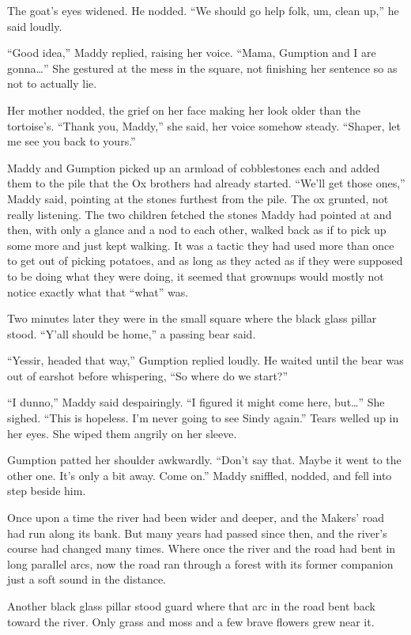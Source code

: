 \documentclass[10pt]{article}
\begin{document}
The goat's eyes widened. He nodded. ``We should go help folk, um, clean
up,'' he said loudly.

``Good idea,'' Maddy replied, raising her voice. ``Mama, Gumption and I
are gonna\ldots{}'' She gestured at the mess in the square, not
finishing her sentence so as not to actually lie.

Her mother nodded, the grief on her face making her look older than the
tortoise's. ``Thank you, Maddy,'' she said, her voice somehow steady.
``Shaper, let me see you back to yours.''

Maddy and Gumption picked up an armload of cobblestones each and added
them to the pile that the Ox brothers had already started. ``We'll get
those ones,'' Maddy said, pointing at the stones furthest from the pile.
The ox grunted, not really listening. The two children fetched the
stones Maddy had pointed at and then, with only a glance and a nod to
each other, walked back as if to pick up some more and just kept
walking. It was a tactic they had used more than once to get out of
picking potatoes, and as long as they acted as if they were supposed to
be doing what they were doing, it seemed that grownups would mostly not
notice exactly what that ``what'' was.

Two minutes later they were in the small square where the black glass
pillar stood. ``Y'all should be home,'' a passing bear said.

``Yessir, headed that way,'' Gumption replied loudly. He waited until
the bear was out of earshot before whispering, ``So where do we start?''

``I dunno,'' Maddy said despairingly. ``I figured it might come here,
but\ldots{}'' She sighed. ``This is hopeless. I'm never going to see
Sindy again.'' Tears welled up in her eyes. She wiped them angrily on
her sleeve.

Gumption patted her shoulder awkwardly. ``Don't say that. Maybe it went
to the other one. It's only a bit away. Come on.'' Maddy sniffled,
nodded, and fell into step beside him.

Once upon a time the river had been wider and deeper, and the Makers'
road had run along its bank. But many years had passed since then, and
the river's course had changed many times. Where once the river and the
road had bent in long parallel arcs, now the road ran through a forest
with its former companion just a soft sound in the distance.

Another black glass pillar stood guard where that arc in the road bent
back toward the river. Only grass and moss and a few brave flowers grew
near it.
\end{document}
